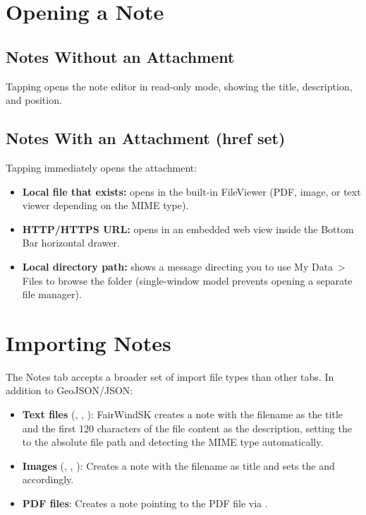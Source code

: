 \section{Opening a Note}

\subsection{Notes Without an Attachment}

Tapping  opens the note editor in read-only mode, showing the title, description, and position.

\subsection{Notes With an Attachment (href set)}

Tapping  immediately opens the attachment:

\begin{itemize}
  \item \textbf{Local file that exists:} opens in the built-in FileViewer (PDF, image, or text viewer depending on the MIME type).
  \item \textbf{HTTP/HTTPS URL:} opens in an embedded web view inside the Bottom Bar horizontal drawer.
  \item \textbf{Local directory path:} shows a message directing you to use My Data~> Files to browse the folder (single-window model prevents opening a separate file manager).
\end{itemize}

\section{Importing Notes}

The Notes tab accepts a broader set of import file types than other tabs.
In addition to GeoJSON/JSON:

\begin{itemize}
  \item \textbf{Text files} (, , ): FairWindSK creates a note with the filename as the title and the first 120 characters of the file content as the description, setting the  to the absolute file path and detecting the MIME type automatically.
  \item \textbf{Images} (, , ): Creates a note with the filename as title and sets the  and  accordingly.
  \item \textbf{PDF files}: Creates a note pointing to the PDF file via .
\end{itemize}

